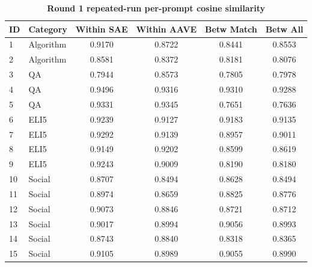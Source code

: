 \begin{table}[htbp]
\centering
\caption{\textbf{Round 1 repeated-run per-prompt cosine similarity}}
\label{tab:round1-repeated-cosine-per-prompt}
\renewcommand{\arraystretch}{1.4}
\begin{tabular}{|l|l|c|c|c|c|}
\hline
\textbf{ID} & \textbf{Category} & \textbf{Within SAE} & \textbf{Within AAVE} & \textbf{Betw Match} & \textbf{Betw All} \\
\hline
1 & Algorithm & 0.9170 & 0.8722 & 0.8441 & 0.8553 \\
\hline
2 & Algorithm & 0.8581 & 0.8372 & 0.8181 & 0.8076 \\
\hline
3 & QA & 0.7944 & 0.8573 & 0.7805 & 0.7978 \\
\hline
4 & QA & 0.9496 & 0.9316 & 0.9310 & 0.9288 \\
\hline
5 & QA & 0.9331 & 0.9345 & 0.7651 & 0.7636 \\
\hline
6 & ELI5 & 0.9239 & 0.9127 & 0.9183 & 0.9135 \\
\hline
7 & ELI5 & 0.9292 & 0.9139 & 0.8957 & 0.9011 \\
\hline
8 & ELI5 & 0.9149 & 0.9202 & 0.8599 & 0.8619 \\
\hline
9 & ELI5 & 0.9243 & 0.9009 & 0.8190 & 0.8180 \\
\hline
10 & Social & 0.8707 & 0.8494 & 0.8628 & 0.8494 \\
\hline
11 & Social & 0.8974 & 0.8659 & 0.8825 & 0.8776 \\
\hline
12 & Social & 0.9073 & 0.8846 & 0.8721 & 0.8712 \\
\hline
13 & Social & 0.9017 & 0.8994 & 0.9056 & 0.8993 \\
\hline
14 & Social & 0.8743 & 0.8840 & 0.8318 & 0.8365 \\
\hline
15 & Social & 0.9105 & 0.8989 & 0.9055 & 0.8990 \\
\hline
\end{tabular}
\end{table}
